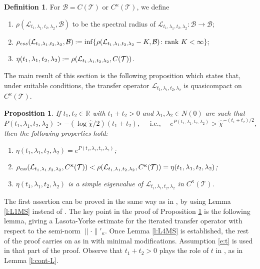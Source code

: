\documentclass[11pt]{amsart}
\theoremstyle{plain}
\newtheorem{prop}[thm]{Proposition}
\theoremstyle{definition}
\newtheorem{defn}[thm]{Definition}
\theoremstyle{remark}
\newcommand*{\defeq}{\mathrel{\vcenter{\baselineskip0.5ex \lineskiplimit0pt
			\hbox{\scriptsize.}\hbox{\scriptsize.}}}%
	=}
\begin{document}
\begin{defn}
For $\mathcal{B} = C(\mathcal T)$ 
or $C^{\kappa}(\mathcal{T})$, we define
\begin{enumerate}
\item $\rho (\mathcal L_{t_1,\lambda_1, t_2, \lambda_2},
\mathcal{B})$ to be the spectral radius of $\mathcal{L}_{t_1,\lambda_1, t_2, \lambda_2} 
\colon \mathcal{B} \to \mathcal{B}$;
\item $
\rho_{ess} (\mathcal L_{t_1,\lambda_1, t_2, \lambda_2},
    \mathcal{B})
\defeq\inf \{
\rho 
(\mathcal L_{t_1,\lambda_1, t_2, \lambda_2} -K, \mathcal{B})\colon \mbox{rank } K < \infty
\};
$
\item $\eta (t_1, \lambda_1, t_2, \lambda_2)
\defeq \rho (\mathcal L_{t_1,\lambda_1, t_2,\lambda_2}, C(\mathcal T))$.
\end{enumerate}
\end{defn}

The main result of this section is the following proposition which states that, under suitable conditions, the transfer operator $\mathcal L_{t_1,\lambda_1, t_2,\lambda_2}$ is quasicompact on $C^{\kappa}(\mathcal{T})$.

\begin{prop}\label{p:MS-gen}
If 
$t_1,t_2 \in \mathbb R$
with $t_1+t_2>0$ and $\lambda_1, \lambda_2 \in N(0)$ are such that 
 \begin{equation}\label{e:t}
P(t_1,\lambda_1,t_2,\lambda_2) > - 
(\log \hat \chi/2) (t_1+t_2),
\quad \mbox{ i.e., }
\quad 
e^{P(t_1,\lambda_1,t_2,\lambda_2)} > \hat \chi^{- (t_1+t_2)/2
},\end{equation}
then 
the following properties hold:
\begin{enumerate}
    \item $\eta(t_1,\lambda_1, t_2, \lambda_2) = e^{P(t_1,\lambda_1, t_2, \lambda_2)}$;
    \item $\rho_{\rm ess}(\mathcal L_{t_1,\lambda_1, t_2,\lambda_2},
    C^{\kappa}(\mathcal{T})) < \rho(\mathcal L_{t_1,\lambda_1, t_2, \lambda_2},C^{\kappa}(\mathcal{T}))=\eta(t_1,\lambda_1, t_2, \lambda_2)$;
    \item $\eta(t_1,\lambda_1, t_2, \lambda_2)$
    is a simple eigenvalue of $\mathcal L_{t_1,\lambda_1, t_2, \lambda_2}$ 
    in $C^{\kappa}(\mathcal{T})$.
\end{enumerate}
\end{prop}

The first assertion can be proved in the same way as in \cite[Section 2.4]{MakSmir03}, 
by using Lemma \ref{l:L1MS} instead of \cite[Lemma 1]{MakSmir03}. 
The key point in the proof of Proposition 
\ref{p:MS-gen} is the following lemma, giving a 
Lasota-Yorke
estimate
for the iterated transfer operator  with respect to the semi-norm $\|\cdot\|'_{\kappa}$. Once Lemma \ref{l:L4MS} 
is established, 
the rest of the proof carries on as in \cite{MakSmir03} with minimal modifications.
Assumption \eqref{e:t} is used in 
that part
of the proof. Observe that $t_1+t_2>0$ plays the role of $t$ in \cite{MakSmir03}, as in Lemma \ref{l:cont-L}.
\end{document}
